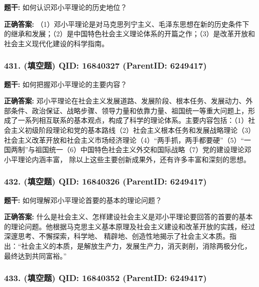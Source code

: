 \documentclass[12pt,UTF8]{ctexart}
\begin{document}
\textbf{题干:}
如何认识邓小平理论的历史地位？



\textbf{正确答案:}
（1）邓小平理论是对马克思列宁主义、毛泽东思想在新的历史条件下的继承和发展；（2）是中国特色社会主义理论体系的开篇之作；（3）是改革开放和社会主义现代化建设的科学指南。

\vspace{0.3em}\hrulefill\vspace{0.7em}

\subsubsection*{431. (填空题) \small QID: 16840327 (ParentID: 6249417)}

\textbf{题干:}
如何把握邓小平理论的主要内容？



\textbf{正确答案:}
邓小平理论在社会主义发展道路、发展阶段、根本任务、发展动力、外部条件、政治保证、战略步骤、领导力量和依靠力量、祖国统一等重大问题上，形成了一系列相互联系的基本观点，构成了科学的理论体系。主要内容包括：（1）社会主义初级阶段理论和党的基本路线（2）社会主义根本任务和发展战略理论（3）社会主义改革开放和社会主义市场经济理论（4）“两手抓，两手都要硬”（5）“一国两制”与祖国统一（6）中国特色社会主义外交和国际战略（7）党的建设理论邓小平理论内涵丰富， 除以上这些主要创新成果外，还有许多丰富和深刻的思想。

\vspace{0.3em}\hrulefill\vspace{0.7em}

\subsubsection*{432. (填空题) \small QID: 16840326 (ParentID: 6249417)}

\textbf{题干:}
如何理解邓小平理论首要的基本的理论问题？



\textbf{正确答案:}
什么是社会主义、怎样建设社会主义是邓小平理论要回答的首要的基本的理论问题。他根据马克思主义基本原理及社会主义建设和改革开放的实践，经过深邃思考、不懈探索，科学地、 精辟地、创造性地揭示了社会主义本质。指出：“社会主义的本质，是解放生产力，发展生产力，消灭剥削，消除两极分化， 最终达到共同富裕。”

\vspace{0.3em}\hrulefill\vspace{0.7em}

\subsubsection*{433. (填空题) \small QID: 16840352 (ParentID: 6249417)}
\end{document}

